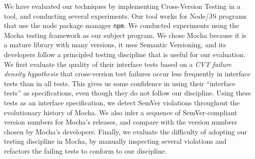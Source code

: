 


We have evaluated our techniques by implementing Cross-Version Testing
in a tool, and conducting several experiments. 
%
Our tool works for Node/JS programs that use the node package manager
{\tt npm}.
%
We conducted experiments using the Mocha testing framework as our
subject program. We chose Mocha because it is a mature library with
many versions, it uses Semantic Versioning, and its developers follow
a principled testing discipline that is useful for our evaluation.
%
We first evaluate the quality of their interface tests based on a {\em
  CVT failure density hypothesis} that cross-version test failures
occur less frequently in interface tests than in all tests. This gives
us some confidence in using their ``interface tests'' as
specifications, even though they do not follow our discipline.
%
Using these tests as an interface specification, we detect SemVer
violations throughout the evolutionary history of Mocha.
%
We also infer a sequence of SemVer-compliant version numbers for
Mocha's releases, and compare with the version numbers chosen by
Mocha's developers.
%
Finally, we evaluate the difficulty of adopting our testing discipline
in Mocha, by manually inspecting several violations and refactors the
failing tests to conform to our discipline.


